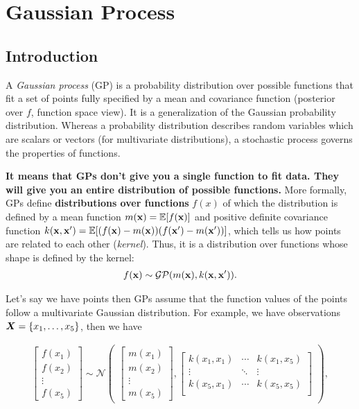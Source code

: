 \chapter{Gaussian Process}

\section{Introduction}
\label{sec:gaussian_process}
A \textit{Gaussian process} (GP) is a probability distribution over possible functions that fit a set of points fully specified by a mean and covariance function (posterior over $f$, function space view). It is a generalization of the Gaussian probability distribution. Whereas a probability distribution describes random variables which are scalars or vectors (for multivariate distributions), a stochastic process governs the properties of functions.


\textbf{It means that GPs don't give you a single function to fit data. They will give you an entire distribution of possible functions.}   More formally, GPs define \textbf{distributions over functions} $f(x)$ of which the distribution is defined by a mean function $m({\mathbf{x}})=\mathbb{E}[f({\mathbf{x}})]$ and positive definite covariance function $k({\mathbf{x}},{\mathbf{x}}')=\mathbb{E}[(f({\mathbf{x}})-m({\mathbf{x}}))(f({\mathbf{x}}')-m({\mathbf{x}}'))]$, which tells us how points are related to each other (\ie \textit{kernel}). Thus, it is a distribution over functions whose shape is defined by the kernel:
\begin{align*}
	f({\mathbf{x}}) \sim \mathcal{GP}(m({\mathbf{x}}),k({\mathbf{x}},{\mathbf{x}}')).
\end{align*}

Let's say we have points then GPs assume that the function values of the points follow a multivariate Gaussian distribution. For example, we have observations ${\bm{X}}=\{x_1, \dots, x_5\}$, then we have

\begin{align*}
	\begin{bmatrix}
		f(x_1)\\
		f(x_2)\\
		\vdots \\
		f(x_5)
	\end{bmatrix}\sim \mathcal{N}
	\begin{pmatrix}
	\begin{bmatrix}
		m(x_1)\\
		m(x_2)\\
		\vdots\\
		m(x_5)
	\end{bmatrix},
	\begin{bmatrix}
		k(x_1,x_1)& \cdots& k(x_1,x_5)\\
		\vdots& \ddots& \vdots\\
		k(x_5,x_1)& \cdots& k(x_5,x_5)\\
	\end{bmatrix}
	\end{pmatrix},
\end{align*}

